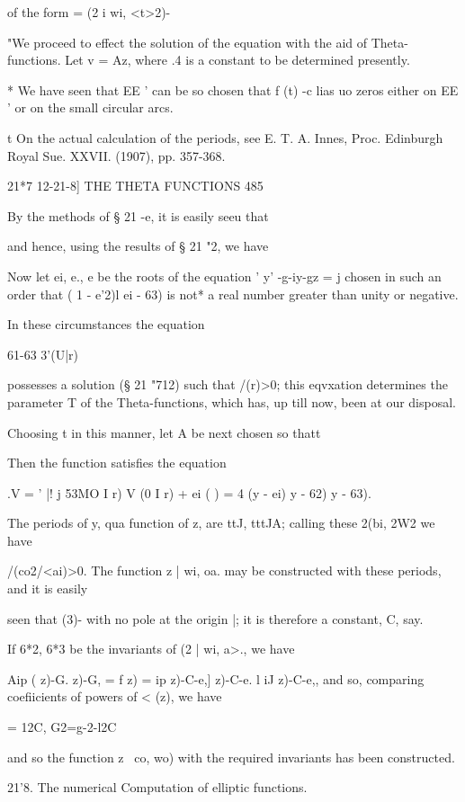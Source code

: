 of the form = (2 i wi, <t>2)-

"We proceed to effect the solution of the equation with the aid of
Theta-functions. Let v = Az, where .4 is a constant to be determined
presently.

* We have seen that EE ' can be so chosen that f (t) -c lias uo zeros
either on EE ' or on the small circular arcs.

t On the actual calculation of the periods, see E. T. A. Innes, Proc.
Edinburgh Royal Sue. XXVII. (1907), pp. 357-368.

21*7 12-21-8] THE THETA FUNCTIONS 485

By the methods of § 21 -e, it is easily seeu that

and hence, using the results of § 21 "2, we have

Now let ei, e., e be the roots of the equation ' y' -g-iy-gz = j
chosen in such an order that ( 1 - e'2)l ei - 63) is not* a real
number greater than unity or negative.

In these circumstances the equation

61-63 3'(U|r)

possesses a solution (§ 21 "712) such that /(r)>0; this eqvxation
determines the parameter T of the Theta-functions, which has, up till
now, been at our disposal.

Choosing t in this manner, let A be next chosen so thatt

Then the function satisfies the equation

.V = ' |! j 53MO I r) V (0 I r) + ei ( ) = 4 (y - ei) y - 62) y - 63).

The periods of y, qua function of z, are ttJ, tttJA; calling these
2(bi, 2W2 we have

/(co2/<ai)>0. The function z | wi, oa. may be constructed with these
periods, and it is easily

seen that (3)- %
with no pole at the origin |; it is therefore a constant, C, say.

If 6*2, 6*3 be the invariants of (2 | wi, a>., we have

Aip ( z)-G. z)-G, = f z) = ip z)-C-e,] z)-C-e. l iJ z)-C-e,, and so,
comparing coefiicients of powers of < (z), we have

= 12C, G2=g-2-l2C%

and so the function z \ co, wo) with the required invariants has been
constructed.

21'8. The numerical Computation of elliptic functions.

